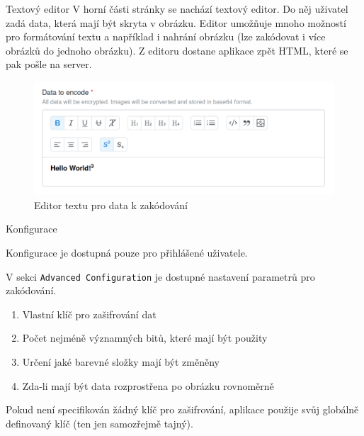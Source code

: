 \begin{subsubsection}{Textový editor}\label{subsubsec:textovy-editor}
V horní části stránky se nachází textový editor.
Do něj uživatel zadá data, která mají být skryta v obrázku.
Editor umožňuje mnoho možností pro formátování textu a například i nahrání
obrázku (lze zakódovat i více obrázků do jednoho obrázku).
Z editoru dostane aplikace zpět HTML, které se pak pošle na server.

\begin{figure}[h]
    \centering
    \includegraphics[scale=0.5]{assets/images/encode-editor}
    \caption{Editor textu pro data k zakódování}\label{fig:editor-textu}
\end{figure}

\end{subsubsection}

\begin{subsubsection}{Konfigurace}\label{subsubsec:enc-konfigurace}

Konfigurace je dostupná pouze pro přihlášené uživatele.

V sekci \texttt{Advanced Configuration} je dostupné nastavení parametrů
pro zakódování.

\begin{enumerate}
    \item Vlastní klíč pro zašifrování dat
    \item Počet nejméně významných bitů, které mají být použity
    \item Určení jaké barevné složky mají být změněny
    \item Zda-li mají být data rozprostřena po obrázku rovnoměrně
\end{enumerate}

Pokud není specifikován žádný klíč pro zašifrování, aplikace použije
svůj globálně definovaný klíč (ten jen samozřejmě tajný).

\end{subsubsection}


